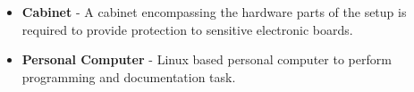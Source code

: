 \begin{enumerate}
\begin{itemize}
     	\item \textbf{Cabinet} -  A cabinet encompassing the hardware parts of the setup is required to provide protection to sensitive electronic boards. 
     	
     	\item \textbf{Personal Computer} - Linux based personal computer to perform programming and documentation task. 
     	
     \end{itemize}	 
 \end{enumerate} 